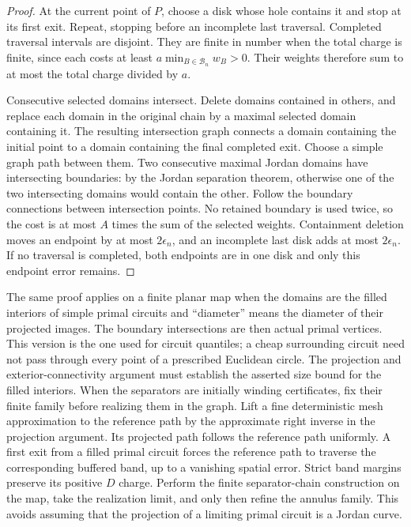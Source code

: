\begin{proof}
At the current point of $P$, choose a disk whose hole contains it and stop
at its first exit.  Repeat, stopping before an incomplete last traversal.
Completed traversal intervals are disjoint.  They are finite in number
when the total charge is finite, since each costs at least
$a\min_{B\in\mathcal B_n}w_B>0$.  Their weights therefore sum to at most
the total charge divided by $a$.

Consecutive selected domains intersect.  Delete domains contained in others,
and replace each domain in the original chain by a maximal selected domain
containing it.  The resulting intersection graph connects a domain
containing the initial point to a domain containing the final completed
exit.  Choose a simple graph path between them.  Two consecutive maximal
Jordan domains have intersecting boundaries: by the Jordan separation
theorem, otherwise one of the two intersecting domains would contain the
other.  Follow the boundary connections between intersection points.  No retained boundary is used
twice, so the cost is at most $A$ times the sum of the selected weights.
Containment deletion moves an endpoint by at most $2\epsilon_n$, and an
incomplete last disk adds at most $2\epsilon_n$.  If no traversal is
completed, both endpoints are in one disk and only this endpoint error
remains.
\end{proof}

The same proof applies on a finite planar map when the domains are the
filled interiors of simple primal circuits and ``diameter'' means the
diameter of their projected images.  The boundary intersections are then
actual primal vertices.  This version is the one used for circuit
quantiles; a cheap surrounding circuit need not pass through every point
of a prescribed Euclidean circle.  The projection and exterior-connectivity
argument must establish the asserted size bound for the filled interiors.
When the separators are initially winding certificates, fix their
finite family before realizing them in the graph.  Lift a fine
deterministic mesh approximation to the reference path by the
approximate right inverse in the projection argument.  Its projected
path follows the reference path uniformly.  A first exit from a
filled primal circuit forces the reference path to traverse the
corresponding buffered band, up to a vanishing spatial error.
Strict band margins preserve its positive $D$ charge.  Perform the
finite separator-chain construction on the map, take the realization
limit, and only then refine the annulus family.  This avoids assuming
that the projection of a limiting primal circuit is a Jordan curve.

